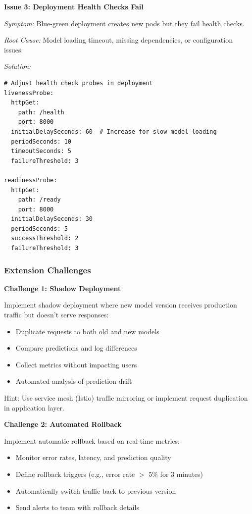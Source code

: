 \textbf{Issue 3: Deployment Health Checks Fail}

\textit{Symptom:} Blue-green deployment creates new pods but they fail health checks.

\textit{Root Cause:} Model loading timeout, missing dependencies, or configuration issues.

\textit{Solution:}
\begin{lstlisting}[style=yaml]
# Adjust health check probes in deployment
livenessProbe:
  httpGet:
    path: /health
    port: 8000
  initialDelaySeconds: 60  # Increase for slow model loading
  periodSeconds: 10
  timeoutSeconds: 5
  failureThreshold: 3

readinessProbe:
  httpGet:
    path: /ready
    port: 8000
  initialDelaySeconds: 30
  periodSeconds: 5
  successThreshold: 2
  failureThreshold: 3
\end{lstlisting}

\subsubsection*{Extension Challenges}

\textbf{Challenge 1: Shadow Deployment}

Implement shadow deployment where new model version receives production traffic
but doesn't serve responses:
\begin{itemize}
    \item Duplicate requests to both old and new models
    \item Compare predictions and log differences
    \item Collect metrics without impacting users
    \item Automated analysis of prediction drift
\end{itemize}

Hint: Use service mesh (Istio) traffic mirroring or implement request duplication
in application layer.

\textbf{Challenge 2: Automated Rollback}

Implement automatic rollback based on real-time metrics:
\begin{itemize}
    \item Monitor error rates, latency, and prediction quality
    \item Define rollback triggers (e.g., error rate $>$ 5\% for 3 minutes)
    \item Automatically switch traffic back to previous version
    \item Send alerts to team with rollback details
\end{itemize}

